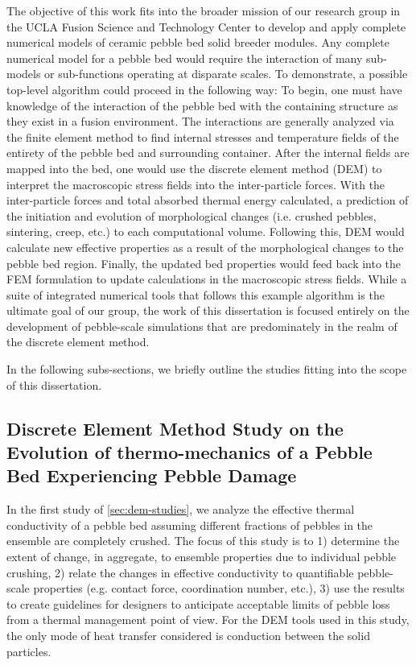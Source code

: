The objective of this work fits into the broader mission of our research group in the UCLA Fusion Science and Technology Center to develop and apply complete numerical models of ceramic pebble bed solid breeder modules. Any complete numerical model for a pebble bed would require the interaction of many sub-models or sub-functions operating at disparate scales. To demonstrate, a possible top-level algorithm could proceed in the following way: To begin, one must have knowledge of the interaction of the pebble bed with the containing structure as they exist in a fusion environment. The interactions are generally analyzed via the finite element method to find internal stresses and temperature fields of the entirety of the pebble bed and surrounding container. After the internal fields are mapped into the bed, one would use the discrete element method (DEM) to interpret the macroscopic stress fields into the inter-particle forces. With the inter-particle forces and total absorbed thermal energy calculated, a prediction of the initiation and evolution of morphological changes (i.e. crushed pebbles, sintering, creep, etc.) to each computational volume. Following this, DEM would calculate new effective properties as a result of the morphological changes to the pebble bed region. Finally, the updated bed properties would feed back into the FEM formulation to update calculations in the macroscopic stress fields. While a suite of integrated numerical tools that follows this example algorithm is the ultimate goal of our group, the work of this dissertation is focused entirely on the development of pebble-scale simulations that are predominately in the realm of the discrete element method.

In the following subs-sections, we briefly outline the studies fitting into the scope of this dissertation. 

\subsection*{Discrete Element Method Study on the Evolution of thermo-mechanics of a Pebble Bed Experiencing Pebble Damage}
In the first study of \cref{sec:dem-studies}, we analyze the effective thermal conductivity of a pebble bed assuming different fractions of pebbles in the ensemble are completely crushed. The focus of this study is to 1) determine the extent of change, in aggregate, to ensemble properties due to individual pebble crushing, 2) relate the changes in effective conductivity to quantifiable pebble-scale properties (e.g. contact force, coordination number, etc.), 3) use the results to create guidelines for designers to anticipate acceptable limits of pebble loss from a thermal management point of view. For the DEM tools used in this study, the only mode of heat transfer considered is conduction between the solid particles. 


